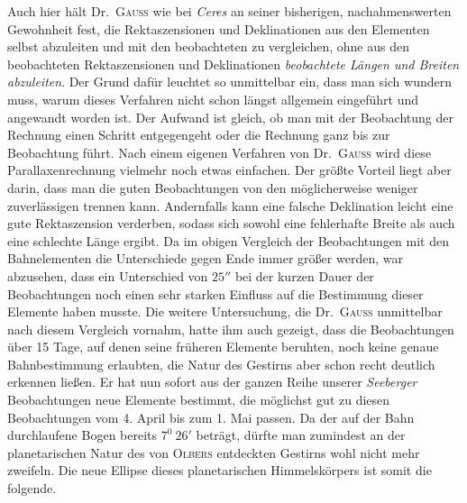 Auch hier hält Dr.\ \textsc{Gauß} wie bei \textit{Ceres} an seiner bisherigen, nachahmenswerten Gewohnheit fest, die Rektaszensionen und Deklinationen aus den Elementen selbst abzuleiten und mit den beobachteten zu vergleichen, ohne aus den beobachteten Rektaszensionen und Deklinationen \textit{beobachtete Längen und Breiten abzuleiten}. Der Grund dafür leuchtet so unmittelbar ein, dass man sich wundern muss, warum
%
dieses Verfahren nicht schon längst allgemein eingeführt und angewandt worden ist. Der Aufwand ist gleich, ob man mit der Beobachtung der Rechnung einen Schritt entgegengeht oder die Rechnung ganz bis zur Beobachtung führt. Nach einem eigenen Verfahren von Dr.\ \textsc{Gauß} wird diese Parallaxenrechnung vielmehr noch etwas einfachen. Der größte Vorteil liegt aber darin, dass man die guten Beobachtungen von den möglicherweise weniger zuverlässigen trennen kann. Andernfalls kann eine falsche Deklination leicht eine gute Rektaszension verderben, sodass sich sowohl eine fehlerhafte Breite als auch eine schlechte Länge ergibt. Da im obigen Vergleich der Beobachtungen mit den Bahnelementen die Unterschiede gegen Ende immer größer werden, war abzusehen, dass ein Unterschied von $25''$ bei der kurzen Dauer der Beobachtungen noch einen sehr starken Einfluss auf die Bestimmung dieser Elemente haben musste. Die weitere Untersuchung, die Dr.\ \textsc{Gauß} unmittelbar nach diesem Vergleich vornahm, hatte ihm auch gezeigt, dass die Beobachtungen über 15 Tage, auf denen seine früheren Elemente beruhten, noch keine genaue Bahnbestimmung erlaubten, die Natur des Gestirns aber schon recht deutlich erkennen ließen. Er hat nun sofort aus der ganzen Reihe unserer \textit{Seeberger} Beobachtungen neue Elemente bestimmt, die möglichst gut zu diesen Beobachtungen vom 4. April bis zum 1. Mai passen. Da der auf der Bahn durchlaufene Bogen bereits $7^0\ 26'$ beträgt, dürfte man zumindest an der planetarischen Natur des von \textsc{Olbers} entdeckten Gestirns wohl nicht mehr zweifeln. Die neue Ellipse dieses planetarischen Himmelskörpers ist somit die folgende.
